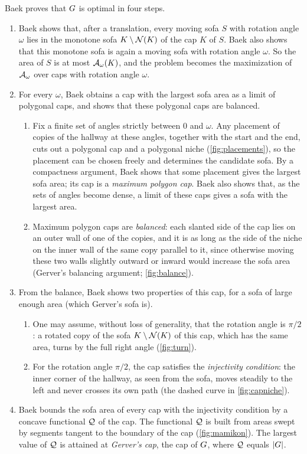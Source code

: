 Baek proves that $G$ is optimal in four steps.
\begin{enumerate}[label=(\arabic*)]
  \item Baek shows that, after a translation, every moving sofa $S$ with
  rotation angle $\omega$ lies in the monotone sofa $K\setminus\mathcal{N}(K)$ of the
  cap $K$ of $S$. Baek also shows that this monotone sofa is again a moving sofa
  with rotation angle $\omega$. So the area of $S$ is at most $\mathcal{A}_\omega(K)$,
  and the problem becomes the maximization of $\mathcal{A}_\omega$ over caps with
  rotation angle $\omega$.
  \item For every $\omega$, Baek obtains a cap with the largest sofa area as a
  limit of polygonal caps, and shows that these polygonal caps are balanced.
  \begin{enumerate}[label=(\alph*)]
    \item Fix a finite set of angles strictly between $0$ and $\omega$. Any
    placement of copies of the hallway at these angles, together with the start
    and the end, cuts out a polygonal cap and a polygonal niche
    (\cref{fig:placements}), so the placement can be chosen freely and
    determines the candidate sofa. By a compactness argument, Baek shows that
    some placement gives the largest sofa area; its cap is a \emph{maximum
    polygon cap}. Baek also shows that, as the sets of angles become dense, a
    limit of these caps gives a sofa with the largest area.
    \item Maximum polygon caps are \emph{balanced}: each slanted side of the cap
    lies on an outer wall of one of the copies, and it is as long as the side of
    the niche on the inner wall of the same copy parallel to it, since otherwise
    moving these two walls slightly outward or inward would increase the sofa
    area (Gerver's balancing argument; \cref{fig:balance}).
  \end{enumerate}
  \item From the balance, Baek shows two properties of this cap, for a sofa of
  large enough area (which Gerver's sofa is).
  \begin{enumerate}[label=(\alph*)]
    \item One may assume, without loss of generality, that the rotation angle is
    $\pi/2$: a rotated copy of the sofa $K\setminus\mathcal{N}(K)$ of this cap, which
    has the same area, turns by the full right angle (\cref{fig:turn}).
    \item For the rotation angle $\pi/2$, the cap satisfies the
    \emph{injectivity condition}: the inner corner of the hallway, as seen from
    the sofa, moves steadily to the left and never crosses its own path (the
    dashed curve in \cref{fig:capniche}).
  \end{enumerate}
  \item Baek bounds the sofa area of every cap with the injectivity condition by
  a concave functional $\mathcal{Q}$ of the cap. The functional $\mathcal{Q}$ is built from
  areas swept by segments tangent to the boundary of the cap
  (\cref{fig:mamikon}). The largest value of $\mathcal{Q}$ is attained at \emph{Gerver's
  cap}, the cap of $G$, where $\mathcal{Q}$ equals $\lvert G\rvert$.
\end{enumerate}

